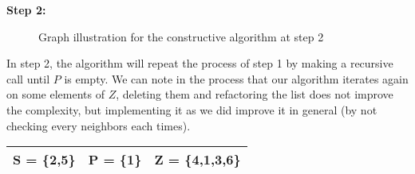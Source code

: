 \vspace{1\baselineskip}

\begin{minipage}{\linewidth}
    \textbf{Step 2:}

    \begin{minipage}{0.4\textwidth}
        \begin{figure}[H]
            \centering
            \caption{Graph illustration for the constructive algorithm at step 2}
            \label{fig:constructive-mewc-edge-step2}
        \end{figure}
    \end{minipage}
    \hspace{0.04\linewidth}
    \begin{minipage}{0.55\textwidth}
        In step 2, the algorithm will repeat the process of step 1 by making a recursive call until $P$ is empty. We can note in the process that our algorithm iterates again on some elements of $Z$, deleting them and refactoring the list does not improve the complexity, but implementing it as we did improve it in general (by not checking every neighbors each times).

        \begin{center}
            \begin{tabular}{|lll|}
                \hline
                S = \{2,5\} & P = \{1\} & Z = \{4,1,3,6\} \\
                \hline
            \end{tabular}
        \end{center}
    \end{minipage}
\end{minipage}

